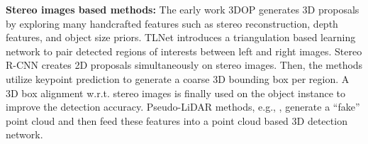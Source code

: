 \documentclass[10pt,twocolumn,letterpaper]{article}
\renewcommand{\paragraph}[1]{

        \vspace{3pt}
	\noindent\textbf{#1}}
\begin{document}
    \paragraph{Stereo images based methods:} 
    The early work 3DOP \cite{3dop_2015} generates 3D proposals by exploring many handcrafted features such as stereo reconstruction, depth features, and object size priors. TLNet \cite{tinet_2019} introduces a triangulation based learning network to pair detected regions of interests between left and right images. Stereo R-CNN \cite{stereorcnn_2019} creates 2D proposals simultaneously on stereo images. Then, the methods utilize keypoint prediction to generate a coarse 3D bounding box per region. A 3D box alignment w.r.t. stereo images is finally used on the object instance to improve the detection accuracy. Pseudo-LiDAR methods, e.g., \cite{pl_2019}, generate a ``fake'' point cloud and then feed these features into a point cloud based 3D detection network.
\end{document}
